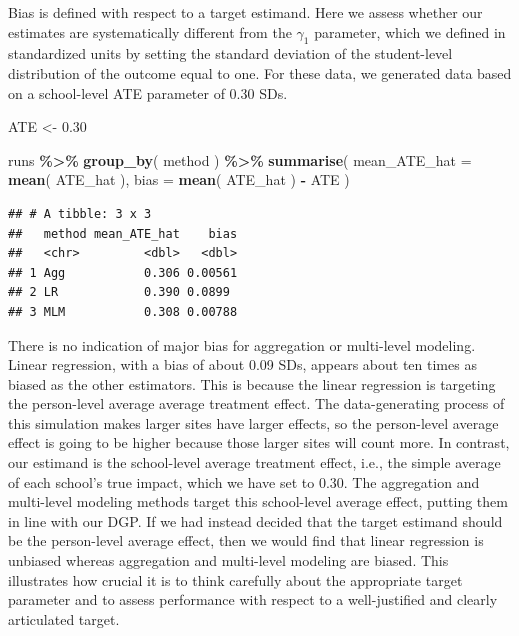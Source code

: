 \documentclass[
]{book}
\newenvironment{Shaded}{\begin{snugshade}}{\end{snugshade}}
\newcommand{\AttributeTok}[1]{\textcolor[rgb]{0.13,0.29,0.53}{#1}}
\newcommand{\FloatTok}[1]{\textcolor[rgb]{0.00,0.00,0.81}{#1}}
\newcommand{\FunctionTok}[1]{\textcolor[rgb]{0.13,0.29,0.53}{\textbf{#1}}}
\newcommand{\NormalTok}[1]{#1}
\newcommand{\OtherTok}[1]{\textcolor[rgb]{0.56,0.35,0.01}{#1}}
\newcommand{\SpecialCharTok}[1]{\textcolor[rgb]{0.81,0.36,0.00}{\textbf{#1}}}
\begin{document}
Bias is defined with respect to a target estimand.
Here we assess whether our estimates are systematically different from the \(\gamma_1\) parameter, which we defined in standardized units by setting the standard deviation of the student-level distribution of the outcome equal to one.
For these data, we generated data based on a school-level ATE parameter of 0.30 SDs.

\begin{Shaded}
\begin{Highlighting}[]
\NormalTok{ATE }\OtherTok{\textless{}{-}} \FloatTok{0.30}

\NormalTok{runs }\SpecialCharTok{\%\textgreater{}\%} 
  \FunctionTok{group\_by}\NormalTok{( method ) }\SpecialCharTok{\%\textgreater{}\%}
  \FunctionTok{summarise}\NormalTok{( }
    \AttributeTok{mean\_ATE\_hat =} \FunctionTok{mean}\NormalTok{( ATE\_hat ),}
    \AttributeTok{bias =} \FunctionTok{mean}\NormalTok{( ATE\_hat ) }\SpecialCharTok{{-}}\NormalTok{ ATE}
\NormalTok{  )}
\end{Highlighting}
\end{Shaded}

\begin{verbatim}
## # A tibble: 3 x 3
##   method mean_ATE_hat    bias
##   <chr>         <dbl>   <dbl>
## 1 Agg           0.306 0.00561
## 2 LR            0.390 0.0899 
## 3 MLM           0.308 0.00788
\end{verbatim}

There is no indication of major bias for aggregation or multi-level modeling.
Linear regression, with a bias of about 0.09 SDs, appears about ten times as biased as the other estimators.
This is because the linear regression is targeting the person-level average average treatment effect.
The data-generating process of this simulation makes larger sites have larger effects, so the person-level average effect is going to be higher because those larger sites will count more.
In contrast, our estimand is the school-level average treatment effect, i.e., the simple average of each school's true impact, which we have set to 0.30.
The aggregation and multi-level modeling methods target this school-level average effect, putting them in line with our DGP.
If we had instead decided that the target estimand should be the person-level average effect, then we would find that linear regression is unbiased whereas aggregation and multi-level modeling are biased.
This illustrates how crucial it is to think carefully about the appropriate target parameter and to assess performance with respect to a well-justified and clearly articulated target.
\end{document}
